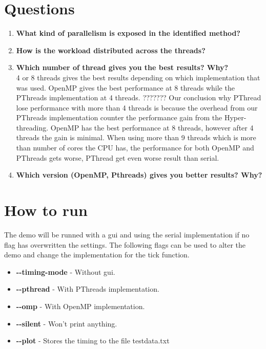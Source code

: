 \documentclass[a4paper,11pt]{article}
\begin{document}
\section{Questions}
\begin{enumerate}[label=\Alph*.]
\item \textbf{What kind of parallelism is exposed in the identified method?}\\
  
\item \textbf{How is the workload distributed across the threads?}\\
  
\item \textbf{Which number of thread gives you the best results? Why?}\\
  4 or 8 threads gives the best results depending on which implementation that was used. OpenMP gives the best performance at 8 threads while the PThreads implementation at 4 threads. ??????? Our conclusion why PThread lose performance with more than 4 threads is because the overhead from our PThreads implementation counter the performance gain from the Hyper-threading. OpenMP has the best performance at 8 threads, however after 4 threads the gain is minimal. When using more than 9 threads which is more than number of cores the CPU has, the performance for both OpenMP and PThreads gets worse, PThread get even worse result than serial.
\item \textbf{Which version (OpenMP, Pthreads) gives you better results? Why?}\\
  
\end{enumerate}
\section{How to run}
The demo will be runned with a gui and using the serial implementation if no flag has overwritten the settings. The following flags can be used to alter the demo and change the implementation for the tick function.
\begin{itemize}[label=,leftmargin=0pt]
\item \textbf{-\--timing-mode} - Without gui.
\item \textbf{-\--pthread} - With PThreads implementation.
\item \textbf{-\--omp} - With OpenMP implementation.
\item \textbf{-\--silent} - Won't print anything.
\item \textbf{-\--plot} - Stores the timing to the file testdata.txt
\end{itemize}
\end{document}
